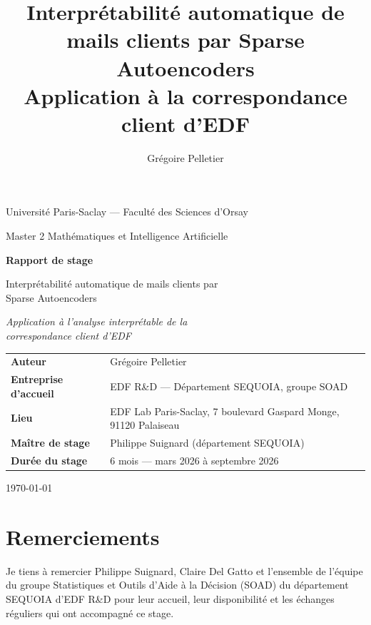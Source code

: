 \documentclass[11pt]{article}
\title{Interprétabilité automatique de mails clients par Sparse Autoencoders\\
\large Application à la correspondance client d'EDF}
\author{Grégoire Pelletier}
\date{}
\begin{document}
\begin{titlepage}
\centering
\vspace*{1cm}
{\large Université Paris-Saclay --- Faculté des Sciences d'Orsay\par}
{\large Master 2 Mathématiques et Intelligence Artificielle\par}
\vspace{2cm}
{\Huge\bfseries Rapport de stage\par}
\vspace{0.5cm}
{\LARGE Interprétabilité automatique de mails clients par\\ Sparse Autoencoders\par}
\vspace{0.3cm}
{\Large\itshape Application à l'analyse interprétable de la\\ correspondance client d'EDF\par}
\vspace{2.5cm}

\begin{tabular}{ll}
\textbf{Auteur} & Grégoire Pelletier \\[0.3em]
\textbf{Entreprise d'accueil} & EDF R\&D --- Département SEQUOIA, groupe SOAD \\[0.3em]
\textbf{Lieu} & EDF Lab Paris-Saclay, 7 boulevard Gaspard Monge, 91120 Palaiseau \\[0.3em]
\textbf{Maître de stage} & Philippe Suignard (département SEQUOIA) \\[0.3em]
\textbf{Durée du stage} & 6 mois --- mars 2026 à septembre 2026 \\[0.3em]
\end{tabular}

\vfill
{\large \today\par}
\end{titlepage}

\newpage
\section*{Remerciements}

Je tiens à remercier Philippe Suignard, Claire Del Gatto et l'ensemble de l'équipe du groupe
Statistiques et Outils d'Aide à la Décision (SOAD) du département SEQUOIA
d'EDF R\&D pour leur accueil, leur disponibilité et les échanges réguliers qui
ont accompagné ce stage.
\end{document}
